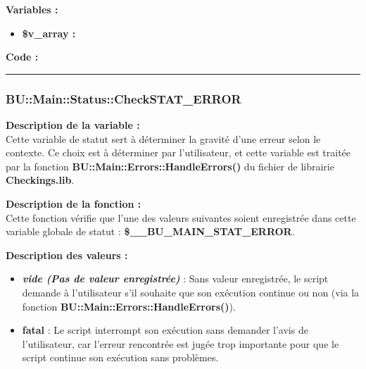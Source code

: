 \documentclass[a4paper,10pt]{article}
\begin{document}
\begin{justify}
    \textbf{Variables :}

    \begin{itemize}
        \item \textbf{\color{orange}\$v\_array\color{white} :}
    \end{itemize}
\end{justify}

\begin{justify}
    \textbf{Code :}
\end{justify}



\color{blue}\par\noindent\rule{\textwidth}{0.4pt}\color{white}

\color{blue}
\subsubsection{\color{mauve}BU::Main::Status::CheckSTAT\_ERROR}\color{white}

\begin{justify}
    \textbf{Description de la variable :}\\
    Cette variable de statut sert à déterminer la gravité d'une erreur selon le contexte. Ce choix est à déterminer par l'utilisateur, et cette variable est traitée par la fonction \textbf{\color{mauve}BU::Main::Errors::HandleErrors()} du fichier de librairie \textbf{\color{lime}Checkings.lib}.
\end{justify}

\begin{justify}
    \textbf{Description de la fonction :}\\
        Cette fonction vérifie que l'une des valeurs suivantes soient enregistrée dans cette variable globale de statut : \textbf{\color{orange}\$\_\_BU\_MAIN\_STAT\_ERROR}.
\end{justify}

\begin{justify}
    \textbf{Description des valeurs :}

    \begin{itemize}
        \item \textbf{\textit{vide (Pas de valeur enregistrée)}} : Sans valeur enregistrée, le script demande à l'utilisateur s'il souhaite que son exécution
        continue ou non (via la fonction \textbf{\color{mauve}BU::Main::Errors::HandleErrors()}).\\

        \item \textbf{fatal} : Le script interrompt son exécution sans demander l'avis de l'utilisateur, car l'erreur rencontrée est jugée trop importante pour que le script continue son exécution sans problèmes.
    \end{itemize}

\end{justify}
\end{document}
